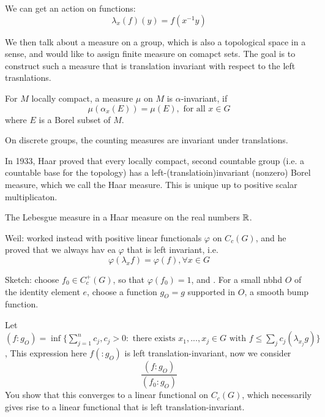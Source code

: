 We can get an action on functions:
\begin{equation*}
    \lambda_x(f)(y)=f(x^{-1}y)
\end{equation*}

We then talk about a measure on a group, which is also a topological space in a sense, and would like to assign finite measure on comapct sets. The goal is to construct such a measure that is translation invariant with respect to the left trasnlations.

\begin{definition}
    For $M$ locally compact, a measure $\mu$ on $M$ is $\alpha$-invariant, if 
    \begin{equation*}
        \mu(\alpha_x(E))=\mu(E), \text{ for all } x\in G
    \end{equation*}
    where $E$ is a Borel subset of $M$.
\end{definition}
\begin{remark}
    On discrete groups, the counting measures are invariant under translations.
\end{remark}

In 1933, Haar proved that every locally compact, second countable group (i.e. a countable base for the topology) has a left-(translatioin)invariant (nonzero) Borel measure, which we call the Haar measure. This is unique up to positive scalar multiplicaton.
\begin{note}
    The Lebesgue measure in a Haar measure on the real numbers $\mathbb{R}$.
\end{note}

Weil: worked instead with positive linear functionals $\varphi$ on $C_c(G)$, and he proved that we always hav ea $\varphi$ that is left invariant, i.e.
\begin{equation*}
    \varphi(\lambda_xf)=\varphi(f), \forall x\in G
\end{equation*}

Sketch: choose $f_0\in C_c^+(G)$, so that $\varphi(f_0)=1$, and . 
For a small nbhd $O$ of the identity element $e$, choose a function $g_O=g$ supported in $O$, a smooth bump function.

Let $(f: g_O)=\inf\{\sum_{j=1}^nc_j, c_j>0: \text{ there exists } x_1, ..., x_j\in G \text{ with } f\leq \sum_jc_j(\lambda_{x_j}g) \}$, This expression here $f(:g_O)$ is left translation-invariant, now we consider
\begin{equation*}
    \frac{(f: g_O)}{(f_0: g_O)}
\end{equation*}
You show that this converges to a linear functional on $C_c(G)$, which necessarily gives rise to a linear functional that is left translation-invariant. 

